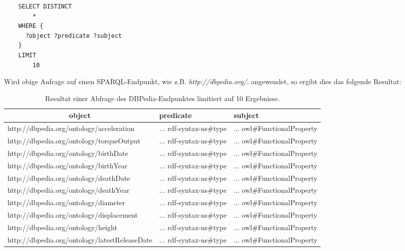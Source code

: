 \begin{lstlisting}
    SELECT DISTINCT
        *
    WHERE {
      ?object ?predicate ?subject
    }
    LIMIT
        10
\end{lstlisting}

Wird obige Anfrage auf einen SPARQL-Endpunkt, wie z.B. \textit{http://dbpedia.org/}, angewendet, so ergibt dies das folgende Resultat:
\noindent\hspace*{15mm}
\begin{table}[h]
    \centering
    \begin{tabular}{l|l|l|}
        \hline
        \multicolumn{1}{c|}{\textbf{object}}                                & \textbf{predicate}                               & \textbf{subject}                                  \\ \hline
        \multicolumn{1}{|l|}{http://dbpedia.org/ontology/acceleration}      & ... rdf-syntax-ns\#type & ... owl\#FunctionalProperty \\ \hline
        \multicolumn{1}{|l|}{http://dbpedia.org/ontology/torqueOutput}      & ... rdf-syntax-ns\#type & ... owl\#FunctionalProperty \\ \hline
        \multicolumn{1}{|l|}{http://dbpedia.org/ontology/birthDate}         & ... rdf-syntax-ns\#type & ... owl\#FunctionalProperty \\ \hline
        \multicolumn{1}{|l|}{http://dbpedia.org/ontology/birthYear}         & ... rdf-syntax-ns\#type & ... owl\#FunctionalProperty \\ \hline
        \multicolumn{1}{|l|}{http://dbpedia.org/ontology/deathDate}         & ... rdf-syntax-ns\#type & ... owl\#FunctionalProperty \\ \hline
        \multicolumn{1}{|l|}{http://dbpedia.org/ontology/deathYear}         & ... rdf-syntax-ns\#type & ... owl\#FunctionalProperty \\ \hline
        \multicolumn{1}{|l|}{http://dbpedia.org/ontology/diameter}          & ... rdf-syntax-ns\#type & ... owl\#FunctionalProperty \\ \hline
        \multicolumn{1}{|l|}{http://dbpedia.org/ontology/displacement}      & ... rdf-syntax-ns\#type & ... owl\#FunctionalProperty \\ \hline
        \multicolumn{1}{|l|}{http://dbpedia.org/ontology/height}            & ... rdf-syntax-ns\#type & ... owl\#FunctionalProperty \\ \hline
        \multicolumn{1}{|l|}{http://dbpedia.org/ontology/latestReleaseDate} & ... rdf-syntax-ns\#type & ... owl\#FunctionalProperty \\ \hline
    \end{tabular}
    \caption{Resultat einer Abfrage des DBPedia-Endpunktes limitiert auf 10 Ergebnisse.}
\end{table}



